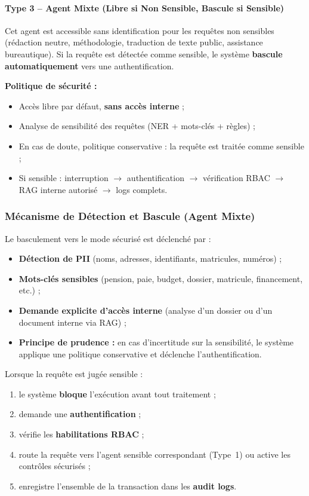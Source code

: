 \documentclass[12pt, a4paper]{report}
\begin{document}
\paragraph{Type 3 -- Agent Mixte (Libre si Non Sensible, Bascule si
Sensible)}
Cet agent est accessible sans identification pour les requêtes non
sensibles (rédaction neutre, méthodologie, traduction de texte public,
assistance bureautique). Si la requête est détectée comme sensible, le
système \textbf{bascule automatiquement} vers une authentification.

\textbf{Politique de sécurité :}
\begin{itemize}
  \item Accès libre par défaut, \textbf{sans accès interne} ;
  \item Analyse de sensibilité des requêtes (NER + mots-clés + règles) ;
  \item En cas de doute, politique conservative : la requête est traitée
        comme sensible ;
  \item Si sensible : interruption $\rightarrow$ authentification
        $\rightarrow$ vérification RBAC $\rightarrow$ RAG interne
        autorisé $\rightarrow$ logs complets.
\end{itemize}

\subsubsection{Mécanisme de Détection et Bascule (Agent Mixte)}

Le basculement vers le mode sécurisé est déclenché par :

\begin{itemize}
  \item \textbf{Détection de PII} (noms, adresses, identifiants,
        matricules, numéros) ;
  \item \textbf{Mots-clés sensibles} (pension, paie, budget, dossier,
        matricule, financement, etc.) ;
  \item \textbf{Demande explicite d'accès interne} (analyse d'un
        dossier ou d'un document interne via RAG) ;
  \item \textbf{Principe de prudence :} en cas d'incertitude sur la
        sensibilité, le système applique une politique conservative et
        déclenche l'authentification.
\end{itemize}

Lorsque la requête est jugée sensible :

\begin{enumerate}
  \item le système \textbf{bloque} l'exécution avant tout traitement ;
  \item demande une \textbf{authentification} ;
  \item vérifie les \textbf{habilitations RBAC} ;
  \item route la requête vers l'agent sensible correspondant (Type~1)
        ou active les contrôles sécurisés ;
  \item enregistre l'ensemble de la transaction dans les
        \textbf{audit logs}.
\end{enumerate}
\end{document}
